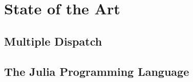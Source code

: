 \chapter{State of the Art}
\label{sec:state-of-the-art}

\section{Multiple Dispatch}
\label{sec:multiple-dispatch}

\section{The Julia Programming Language}
\label{sec:julia}

